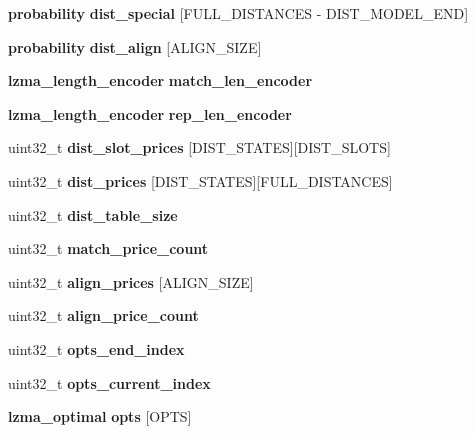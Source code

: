 \begin{DoxyCompactItemize}
\item 
\mbox{\label{structlzma__lzma1__encoder__s_a51b8e63cfadfddc2eb92dfbd66c8cf0e}} 
\textbf{ probability} {\bfseries dist\+\_\+special} [F\+U\+L\+L\+\_\+\+D\+I\+S\+T\+A\+N\+C\+ES -\/ D\+I\+S\+T\+\_\+\+M\+O\+D\+E\+L\+\_\+\+E\+ND]
\item 
\mbox{\label{structlzma__lzma1__encoder__s_ad1bac439023e141829f60c60befac64e}} 
\textbf{ probability} {\bfseries dist\+\_\+align} [A\+L\+I\+G\+N\+\_\+\+S\+I\+ZE]
\item 
\mbox{\label{structlzma__lzma1__encoder__s_a8f55075e84a33873ceb306a440db288b}} 
\textbf{ lzma\+\_\+length\+\_\+encoder} {\bfseries match\+\_\+len\+\_\+encoder}
\item 
\mbox{\label{structlzma__lzma1__encoder__s_af9ed4d9478e7cdb91c26c47024af167c}} 
\textbf{ lzma\+\_\+length\+\_\+encoder} {\bfseries rep\+\_\+len\+\_\+encoder}
\item 
\mbox{\label{structlzma__lzma1__encoder__s_ac3e8893b323dcb669218dde5c7b8af58}} 
uint32\+\_\+t {\bfseries dist\+\_\+slot\+\_\+prices} [D\+I\+S\+T\+\_\+\+S\+T\+A\+T\+ES][D\+I\+S\+T\+\_\+\+S\+L\+O\+TS]
\item 
\mbox{\label{structlzma__lzma1__encoder__s_a95d05ddc83905635e2307ea9a00ca843}} 
uint32\+\_\+t {\bfseries dist\+\_\+prices} [D\+I\+S\+T\+\_\+\+S\+T\+A\+T\+ES][F\+U\+L\+L\+\_\+\+D\+I\+S\+T\+A\+N\+C\+ES]
\item 
\mbox{\label{structlzma__lzma1__encoder__s_a5932d3bec2a78b20a78277e22b029da3}} 
uint32\+\_\+t {\bfseries dist\+\_\+table\+\_\+size}
\item 
\mbox{\label{structlzma__lzma1__encoder__s_a0b5e9abce1112ad2f31b3d622599e242}} 
uint32\+\_\+t {\bfseries match\+\_\+price\+\_\+count}
\item 
\mbox{\label{structlzma__lzma1__encoder__s_a790955ebce2c394db9181674515bc98f}} 
uint32\+\_\+t {\bfseries align\+\_\+prices} [A\+L\+I\+G\+N\+\_\+\+S\+I\+ZE]
\item 
\mbox{\label{structlzma__lzma1__encoder__s_a18e44dcf3f80d6a1d2e540f6037c98ca}} 
uint32\+\_\+t {\bfseries align\+\_\+price\+\_\+count}
\item 
\mbox{\label{structlzma__lzma1__encoder__s_aa538ea0b3fb16f357c8c6d9cbd20fb00}} 
uint32\+\_\+t {\bfseries opts\+\_\+end\+\_\+index}
\item 
\mbox{\label{structlzma__lzma1__encoder__s_ab055477af4538431d120f7ac6cecfd09}} 
uint32\+\_\+t {\bfseries opts\+\_\+current\+\_\+index}
\item 
\mbox{\label{structlzma__lzma1__encoder__s_a881c5be6786f685b3b7760c7d87cbe99}} 
\textbf{ lzma\+\_\+optimal} {\bfseries opts} [O\+P\+TS]
\end{DoxyCompactItemize}


